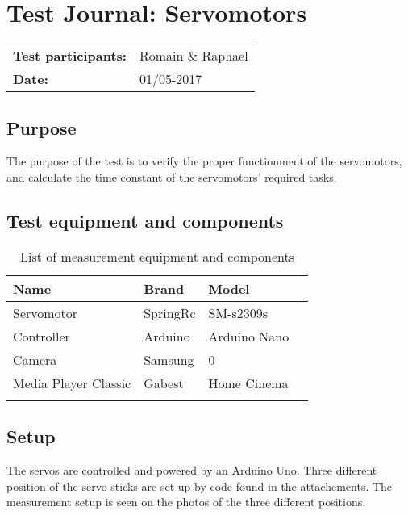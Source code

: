 \graphicspath{{figures/design/}}

\chapter{Test Journal: Servomotors}

\begin{table}[!h]
	\begin{tabular}{l l}
		\textbf{Test participants:} & Romain \& Raphael   \\
		\textbf{Date:}  & 01/05-2017
	\end{tabular}
\end{table}

\section*{Purpose}

The purpose of the test is to verify the proper functionment of the servomotors, and calculate the time constant of the servomotors' required tasks.

\section*{Test equipment and components}


\begin{table}[htbp]
	\centering
	\caption{List of measurement equipment and components}\label{tab_appendix:Servo_equip2}
	
	\begin{tabularx}{\textwidth}{lXXX}
		Name 				& Brand	& Model 									\\ \toprule \rowcolor{lightGrey}
		Servomotor	& SpringRc & SM-s2309s 	\\
		Controller	& Arduino & Arduino Nano\\ \rowcolor{lightGrey}
		Camera & Samsung & 0\\
		Media Player Classic & Gabest & Home Cinema\\ \rowcolor{lightGrey}
	\end{tabularx}
\end{table}




\section*{Setup}

The servos are controlled and powered by an Arduino Uno. Three different position of the servo sticks are set up by code found in the attachements. The measurement setup is seen on the photos of the three different positions. \

